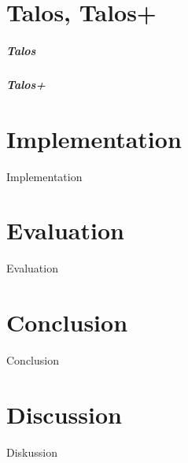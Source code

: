 \documentclass[a4paper,11pt]{report}
\begin{document}
\chapter{Talos, Talos+}
\paragraph{Talos}
\paragraph{Talos+}
\chapter{Implementation}
Implementation
\chapter{Evaluation}
Evaluation
\chapter{Conclusion}
Conclusion
\chapter{Discussion}
Diskussion

\cleardoublepage
\nocite{*}



\appendix
\end{document}
